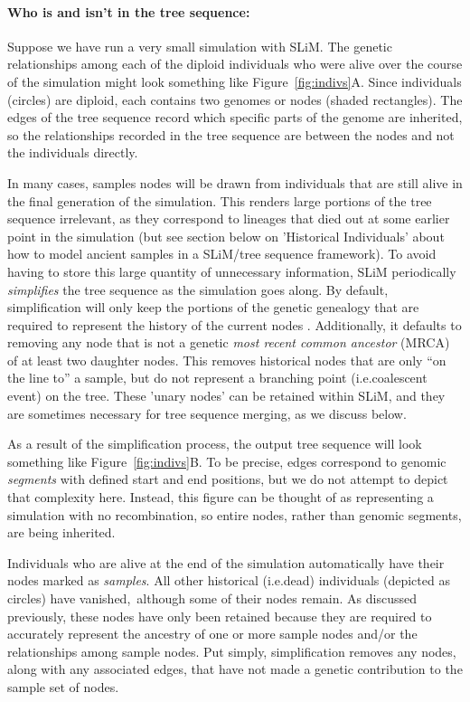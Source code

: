 \documentclass[12pt]{article}
\newcommand*{\ie}{i.e.\xcomma}
\begin{document}
\paragraph{Who is and isn't in the tree sequence:}
Suppose we have run a very small simulation with SLiM. The genetic relationships among each of the
diploid individuals who were alive over the course of the simulation might
look something like Figure~\ref{fig:indivs}A. Since individuals (circles) are diploid, each contains
two genomes or nodes (shaded rectangles).
The edges of the tree sequence record which specific parts of the genome are inherited,
so the relationships recorded in the tree sequence are between the nodes and not the individuals directly.

In many cases, samples nodes will be drawn from individuals that are still alive in the final generation
of the simulation. This renders large portions of the tree sequence irrelevant, as they
correspond to lineages that died out at some earlier point in the simulation (but see section below on
'Historical Individuals' about how to model ancient samples in a SLiM/tree sequence framework). To avoid having to
store this large quantity of unnecessary information, SLiM periodically \textit{simplifies} the tree sequence
as the simulation goes along. By default, simplification will only keep the portions of the
genetic genealogy that are required to represent the history of the current nodes
\citep{kelleher}. Additionally, it defaults to removing any node that is not a genetic
\textit{most recent common ancestor} (MRCA) of at least two daughter nodes. This removes historical
nodes that are only ``on the line to'' a sample, but do not represent a branching point
(\ie coalescent event) on the tree. These 'unary nodes' can be retained within SLiM, and they are
sometimes necessary for tree sequence merging, as we discuss below.

As a result of the simplification process, the output tree sequence will look something like Figure~\ref{fig:indivs}B.
To be precise, edges correspond to genomic \emph{segments} with defined start and end positions,
but we do not attempt to depict that complexity here. Instead, this figure can be thought of as representing a simulation
with no recombination, so entire nodes, rather than genomic segments, are being inherited.

Individuals who are alive at the end of the simulation automatically have their nodes marked as
\textit{samples}. All other historical (\ie dead) individuals (depicted as circles) have vanished,\
although some of their nodes remain. As discussed previously, these nodes have only been retained because they are required to
accurately represent the ancestry of one or more sample nodes and/or the relationships among sample nodes.
Put simply, simplification removes any nodes, along with any associated edges,
that have not made a genetic contribution to the sample set of nodes.
\end{document}
